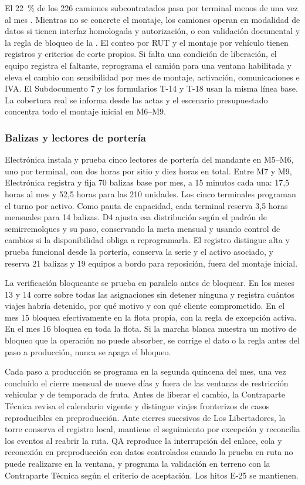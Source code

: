 El 22~\% de los 226 camiones subcontratados pasa por terminal menos de una vez al mes
. Mientras no se concrete el montaje, los camiones operan en
modalidad de datos si tienen interfaz homologada y autorización, o con validación documental y la
regla de bloqueo de la . El conteo por RUT y el montaje por vehículo
tienen registros y criterios de corte propios. Si falta una condición de liberación, el equipo
registra el faltante, reprograma el camión para una ventana habilitada y eleva el cambio con
sensibilidad por mes de montaje, activación, comunicaciones e IVA. El Subdocumento 7 y los formularios
T-14 y T-18 usan la misma línea base. La cobertura real se informa desde las actas y el escenario
presupuestado concentra todo el montaje inicial en M6--M9.

\subsubsection{Balizas y lectores de portería}\label{sec:3-balizas-lectores}

Electrónica instala y prueba cinco lectores de portería del mandante en M5--M6, uno por terminal,
con dos horas por sitio y diez horas en total. Entre M7 y M9, Electrónica registra y fija 70 balizas
base por mes, a 15 minutos cada una: 17,5 horas al mes y 52,5 horas para las 210 unidades. Los cinco
terminales programan el turno por activo. Como pauta de capacidad, cada terminal reserva 3,5 horas
mensuales para 14 balizas. D4 ajusta esa distribución según el padrón de semirremolques y su paso,
conservando la meta mensual y usando control de cambios si la disponibilidad obliga a reprogramarla.
El registro distingue alta y prueba funcional desde la portería, conserva la serie y el activo
asociado, y reserva 21 balizas y 19 equipos a bordo para reposición, fuera del montaje inicial.

La verificación bloqueante se prueba en paralelo antes de bloquear. En los meses 13 y 14 corre sobre todas
las asignaciones sin detener ninguna y registra cuántos viajes habría detenido, por qué motivo y con qué
cliente comprometido. En el mes 15 bloquea efectivamente en la flota propia, con la regla de excepción
activa. En el mes 16 bloquea en toda la flota. Si la marcha blanca muestra un motivo de bloqueo que la
operación no puede absorber, se corrige el dato o la regla antes del paso a producción, nunca se apaga el
bloqueo.

Cada paso a producción se programa en la segunda quincena del mes, una vez concluido el cierre
mensual de nueve días y fuera de las ventanas de restricción vehicular y de temporada de fruta.
Antes de liberar el cambio, la Contraparte Técnica revisa el calendario vigente y distingue
viajes fronterizos de casos reproducibles en preproducción. Ante cierres sucesivos de Los
Libertadores, la torre conserva el registro local, mantiene el seguimiento por excepción y
reconcilia los eventos al reabrir la ruta. QA reproduce la interrupción del enlace, cola y reconexión en
preproducción con datos controlados cuando la prueba en ruta no puede realizarse en la ventana,
y programa la validación en terreno con la Contraparte Técnica según el criterio de aceptación.
Los hitos E-25 se mantienen.

